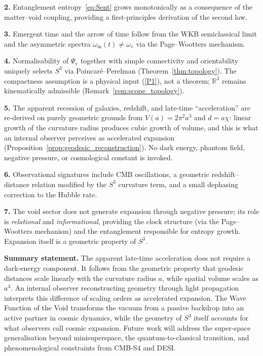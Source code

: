 \documentclass[12pt,a4paper]{article}
\theoremstyle{plain}
\theoremstyle{definition}
\newcommand{\Psiv}{\Psi_{\mathrm{v}}}
\newcommand{\omm}{\omega_{\mathrm{m}}}
\newcommand{\omv}{\omega_{\mathrm{v}}}
\begin{document}
\medskip\noindent\textbf{2.} Entanglement entropy~\eqref{eq:Sent} grows
monotonically as a consequence of the matter--void coupling, providing a
first-principles derivation of the second law.

\medskip\noindent\textbf{3.} Emergent time and the arrow of time follow
from the WKB semiclassical limit and the asymmetric spectra
$\omm(t)\ne\omv$ via the Page--Wootters mechanism.

\medskip\noindent\textbf{4.} Normalisability of $\Psiv$ together with
simple connectivity and orientability uniquely selects $S^3$ via
Poincar\'e--Perelman (Theorem~\ref{thm:topology}).
The compactness assumption is a physical input (\ref{P1}), not a theorem;
$\mathbb{R}^3$ remains kinematically admissible
(Remark~\ref{rem:scope_topology}).

\medskip\noindent\textbf{5.} The apparent recession of galaxies, redshift,
and late-time ``acceleration'' are re-derived on purely geometric grounds
from $V(a) = 2\pi^2 a^3$ and $d = a\chi$: linear growth of the curvature
radius produces cubic growth of volume, and this is what an internal
observer perceives as accelerated expansion (Proposition~\ref{prop:geodesic_reconstruction}).
No dark energy, phantom field, negative pressure, or cosmological constant
is invoked.

\medskip\noindent\textbf{6.} Observational signatures include CMB
oscillations, a geometric redshift--distance relation modified by the
$S^3$ curvature term, and a small dephasing correction to the Hubble rate.

\medskip\noindent\textbf{7.} The void sector does not generate expansion
through negative pressure; its role is \emph{relational} and
\emph{informational}, providing the clock structure (via the Page--Wootters
mechanism) and the entanglement responsible for entropy growth. Expansion
itself is a geometric property of $S^3$.

\bigskip
\noindent\textbf{Summary statement.}
The apparent late-time acceleration does not require a dark-energy
component. It follows from the geometric property that geodesic distances
scale linearly with the curvature radius $a$, while spatial volume scales
as $a^3$. An internal observer reconstructing geometry through light
propagation interprets this difference of scaling orders as accelerated
expansion.
The Wave Function of the Void transforms the vacuum from a passive
backdrop into an active partner in cosmic dynamics, while the geometry of
$S^3$ itself accounts for what observers call cosmic expansion.
Future work will address the super-space generalisation beyond
minisuperspace, the quantum-to-classical transition, and
phenomenological constraints from CMB-S4 and DESI.
\end{document}
